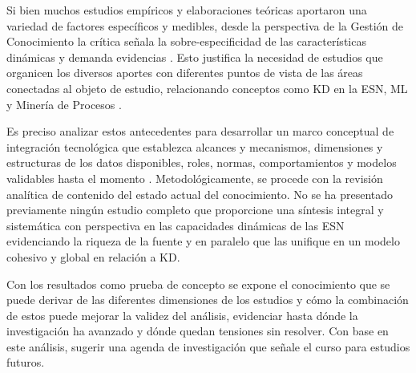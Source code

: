 \documentclass[a4paper,fleqn,spanish]{cas-dc}
\begin{document}
Si bien muchos estudios empíricos y elaboraciones teóricas aportaron una
variedad de factores específicos y medibles, desde la perspectiva de la Gestión
de Conocimiento la crítica señala la sobre-especificidad de las características
dinámicas y demanda evidencias \cite{Farnese2019,Nissen2019,Schilke2018}. Esto
justifica la necesidad de estudios que organicen los diversos aportes con
diferentes puntos de vista de las áreas conectadas al objeto de estudio,
relacionando conceptos como KD en la ESN, ML y Minería de Procesos
\cite{Pham2021}.

Es preciso analizar estos antecedentes para desarrollar un marco conceptual de
integración tecnológica que establezca alcances y mecanismos, dimensiones y
estructuras de los datos disponibles, roles, normas, comportamientos y modelos
validables hasta el momento \cite{Hacker2021,Namisango_2019}.
Metodológicamente, se procede con la revisión analítica de contenido del estado
actual del conocimiento. No se ha presentado previamente ningún estudio
completo que proporcione una síntesis integral y sistemática con perspectiva en
las capacidades dinámicas de las ESN evidenciando la riqueza de la fuente y en
paralelo que las unifique en un modelo cohesivo y global en relación a KD.

Con los resultados como prueba de concepto se expone el conocimiento que se
puede derivar de las diferentes dimensiones de los estudios y cómo la
combinación de estos puede mejorar la validez del análisis, evidenciar hasta dónde la
investigación ha avanzado y dónde quedan tensiones sin resolver. Con base en
este análisis, sugerir una agenda de investigación que señale el curso para
estudios futuros.


%
%

%



%
\end{document}
